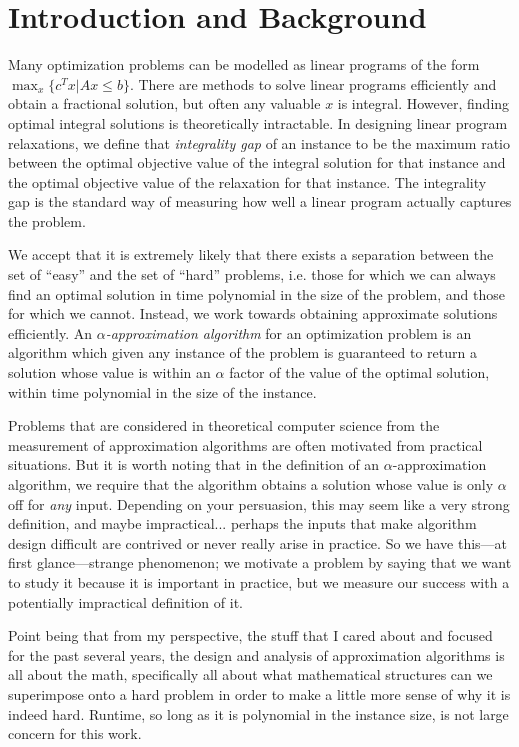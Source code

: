 \chapter{Introduction and Background}



Many optimization problems can be modelled as linear programs of the form $\max_x\{c^T x | Ax \leq b\}$.
There are methods to solve linear programs efficiently and obtain a fractional solution, 
but often any valuable $x$ is integral. 
However, finding optimal integral solutions is theoretically intractable.
In designing linear program relaxations, we define that \emph{integrality gap} of an instance
to be the maximum ratio between the optimal objective value of the integral solution for that instance and the optimal objective value of 
the relaxation for that instance.
The integrality gap is the standard way of measuring 
how well a linear program actually captures the problem. 

We accept that it is extremely likely that there exists a separation 
between the set of ``easy'' and the set of ``hard'' problems, i.e. those for which we can always find an optimal solution in time polynomial in the 
size of the problem, and those for which we cannot. 
Instead, we work towards obtaining approximate solutions efficiently. 
An \emph{$\alpha$-approximation algorithm} for an optimization problem is
an algorithm which given any instance of the problem is guaranteed to return a solution whose value is
within an $\alpha$ factor 
of the value of the optimal solution, within time polynomial in the size of the instance.

Problems that are considered in theoretical computer science from the measurement of approximation algorithms 
are often motivated from practical situations. 
But it is worth noting that in the definition of an $\alpha$-approximation algorithm, 
we require that the algorithm obtains a solution whose value is only $\alpha$ off for \emph{any} input.
Depending on your persuasion, this may seem like a very strong definition, and maybe impractical... 
perhaps the inputs that make algorithm design difficult are contrived or never really arise in practice. 
So we have this---at first glance---strange phenomenon; we motivate a problem by saying that we want to study it because it is important in practice,
but we measure our success with a potentially impractical definition of it.

Point being that from my perspective, the stuff that I cared about and focused for the past several years,
 the design and analysis of approximation algorithms is all about the math, 
specifically all about what mathematical structures can we superimpose onto a hard problem in order to make a little more sense 
of why it is indeed hard. 
Runtime, so long as it is polynomial in the instance size, is not large concern for this work. 




